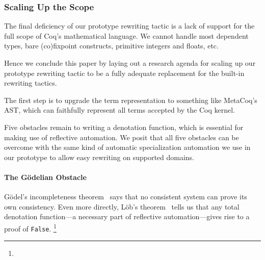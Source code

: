 \documentclass[sn-mathphys,pdflatex]{sn-jnl}%
\theoremstyle{thmstyleone}%
\theoremstyle{thmstyletwo}%
\theoremstyle{thmstylethree}%
\begin{document}
\subsubsection{Scaling Up the Scope}\label{sec:future:complete}

The final deficiency of our prototype rewriting tactic is a lack of support for the full scope of Coq's mathematical language.
We cannot handle most dependent types, bare (co)fixpoint constructs, primitive integers and floats, etc.

Hence we conclude this paper by laying out a research agenda for scaling up our prototype rewriting tactic to be a fully adequate replacement for the built-in rewriting tactics.

The first step is to upgrade the term representation to something like MetaCoq's~\cite{metacoq,malecha2015thesis,coq-coq-correct} AST, which can faithfully represent all terms accepted by the Coq kernel.

Five obstacles remain to writing a denotation function, which is essential for making use of reflective automation.
We posit that all five obstacles can be overcome with the same kind of automatic specialization automation we use in our prototype to allow easy rewriting on supported domains.

\paragraph{The G\"odelian Obstacle}
G\"odel's incompleteness theorem~\cite{godel1931incompleteness} says that no consistent system can prove its own consistency.
Even more directly, L\"ob's theorem~\cite{lob1955theorem} tells us that any total denotation function---a necessary part of reflective automation---gives rise to a proof of \texttt{False}.%
\footnote{%
%
\footnotemark{}
%
}
\end{document}
